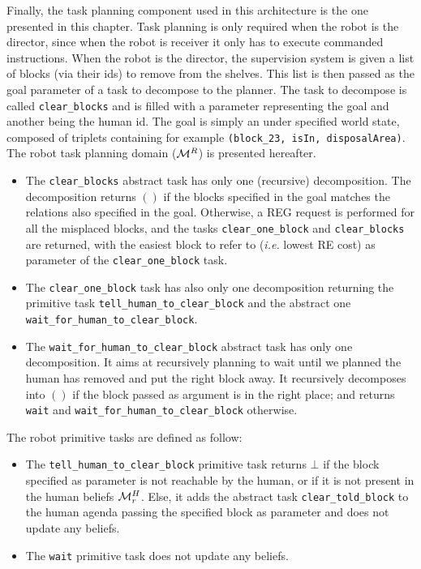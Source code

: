 \documentclass[a4paper,11pt,twoside]{StyleThese}
\begin{document}
Finally, the task planning component used in this architecture is the one presented in this chapter. Task planning is only required when the robot is the director, since when the robot is receiver it only has to execute commanded instructions. When the robot is the director, the supervision system is given a list of blocks (via their ids) to remove from the shelves. This list is then passed as the goal parameter of a task to decompose to the planner.
The task to decompose is called \verb'clear_blocks' and is filled with a parameter representing the goal and another being the human id. The goal is simply an under specified world state, composed of triplets containing for example \verb'(block_23, isIn, disposalArea)'.
The robot task planning domain ($\mathcal{M}^R$) is presented hereafter. 
\begin{itemize}
\item The \verb'clear_blocks' abstract task has only one (recursive) decomposition. The decomposition returns $()$ if the blocks specified in the goal matches the relations also specified in the goal. Otherwise, a REG request is performed for all the misplaced blocks, and the tasks \verb'clear_one_block' and \verb'clear_blocks' are returned, with the easiest block to refer to (\textit{i.e.} lowest RE cost) as parameter of the \verb'clear_one_block' task.
\item The \verb'clear_one_block' task has also only one decomposition returning the primitive task \verb'tell_human_to_clear_block' and the abstract one \verb'wait_for_human_to_clear_block'.
\item The \verb'wait_for_human_to_clear_block' abstract task has only one decomposition. It aims at recursively planning to wait until we planned the human has removed and put the right block away. It recursively decomposes into $()$ if the block passed as argument is in the right place; and returns \verb'wait' and \verb'wait_for_human_to_clear_block' otherwise.
\end{itemize}

The robot primitive tasks are defined as follow:
\begin{itemize}
\item The \verb'tell_human_to_clear_block' primitive task returns $\bot$ if the block specified as parameter is not reachable by the human, or if it is not present in the human beliefs $\mathcal{M}^H_r$. Else, it adds the abstract task \verb'clear_told_block' to the human agenda passing the specified block as parameter and does not update any beliefs.
\item The \verb'wait' primitive task does not update any beliefs.
\end{itemize}
\end{document}
